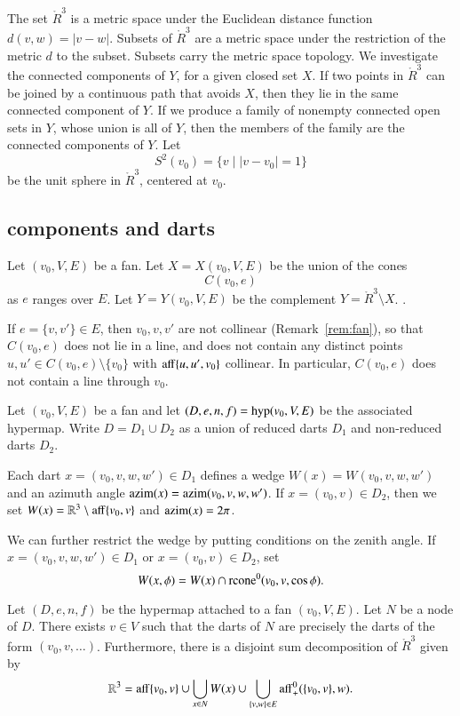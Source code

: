 The set $\ring{R}^3$ is a metric space under the
Euclidean distance function $d(v,w) = |v-w|$.  Subsets of
$\ring{R}^3$ are a metric space under the restriction of the metric
$d$ to the subset. Subsets carry the metric space topology.  We
investigate the connected components of $Y$,
for a given closed set $X$.    If two
points in $\ring{R}^3$ 
can be joined by a continuous path that avoids $X$,
then they lie in the same connected component of $Y$.
If we produce a family of nonempty connected open sets in
$Y$, whose union is all of $Y$, then the
members of the family are the connected components of $Y$.
Let $$S^2(v_0) = \{ v \mid | v-v_0 | = 1\}$$ be the unit sphere in
$\ring{R}^3$, centered at $v_0$.  






\subsection{components and darts}

\begin{definition}\label{def:XY}
Let $(v_0,V,E)$ be a fan.  Let $X=X(v_0,V,E)$ be the union of the
cones
   $$C(v_0,e)$$
as $e$ ranges over $E$.  Let $Y=Y(v_0,V,E)$ be the complement
$Y = \ring{R}^3\setminus X$.
.
\end{definition}

If $e=\{v,v'\}\in E$, then $v_0,v,v'$ are not collinear
(Remark~\ref{rem:fan}), so that $C(v_0,e)$
does not lie in a line, and does not contain any
distinct points $u,u'\in
C(v_0,e)\setminus\{v_0\}$ 
with ${\operatorname{aff}}\{u,u',v_0\}$ collinear. 
In particular, $C(v_0,e)$ does not contain a line through $v_0$.

Let $(v_0,V,E)$ be a fan and let $(D,e,n,f) = {\operatorname{hyp}}(v_0,V,E)$
be the associated hypermap.  Write $D = D_1\cup D_2$ as a union of
reduced darts $D_1$ and non-reduced darts $D_2$.

Each dart $x=(v_0,v,w,w')\in D_1$ defines
a wedge $W(x) = W(v_0,v,w,w')$ and an azimuth angle ${\operatorname{azim}}(x) =
{\operatorname{azim}}(v_0,v,w,w')$.   If $x=(v_0,v)\in D_2$, then we set
$W(x) = \mathbb{R}^3\setminus {\operatorname{aff}}\{v_0,v\}$ and ${\operatorname{azim}}(x) = 2\pi$.

We can further restrict the wedge by putting conditions on the zenith angle.
If $x = (v_0,v,w,w')\in D_1$ or $x = (v_0,v)\in D_2$, set
    $$
    W(x,\phi) = W(x) \cap {\operatorname{rcone}}^0(v_0,v,\cos\phi).
    $$

\begin{lemma}  
Let $(D,e,n,f)$ be the hypermap attached to a 
fan $(v_0,V,E)$.
Let $N$ be a node of $D$.  There exists $v\in V$
such that the darts of $N$ are precisely
the darts of the form $(v_0,v,\ldots)$.  Furthermore, there is a 
disjoint sum decomposition of $\ring{R}^3$ given by
  $$
  \mathbb{R}^3 = 
  {\operatorname{aff}}\{v_0,v\} \cup
  \bigcup_{x\in N} W(x)  \cup 
  \bigcup_{\{v,w\}\in E} {\operatorname{aff}}_+^0(\{v_0,v\},w).
  $$
\end{lemma}

